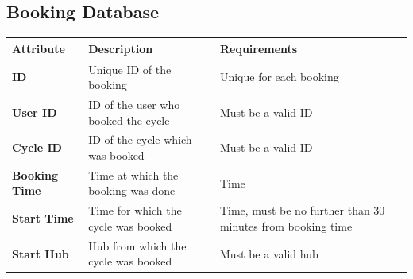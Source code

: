 \documentclass[11pt]{article}
\begin{document}
\begin{appendices}
\subsection{Booking Database}
\begin{center}
\begin{tabular}{|>{\centering\arraybackslash}m{}|>{\centering\arraybackslash}m{}|>{\centering\arraybackslash}m{}|}
    \hline
    \textbf{Attribute} & \textbf{Description} & \textbf{Requirements} \\
    \hline
    \textbf{ID} & Unique ID of the booking &  Unique for each booking\\
    \hline
    \textbf{User ID} & ID of the user who booked the cycle &  Must be a valid ID\\
    \hline
    \textbf{Cycle ID} & ID of the cycle which was booked &  Must be a valid ID\\
    \hline
    \textbf{Booking Time} & Time at which the booking was done &  Time\\
    \hline
    \textbf{Start Time} & Time for which the cycle was booked &  Time, must be no further than 30 minutes from booking time\\
    \hline
    \textbf{Start Hub} & Hub from which the cycle was booked &  Must be a valid hub\\
    \hline
\end{tabular}
\end{center}

\newpage

\end{appendices}
\end{document}
